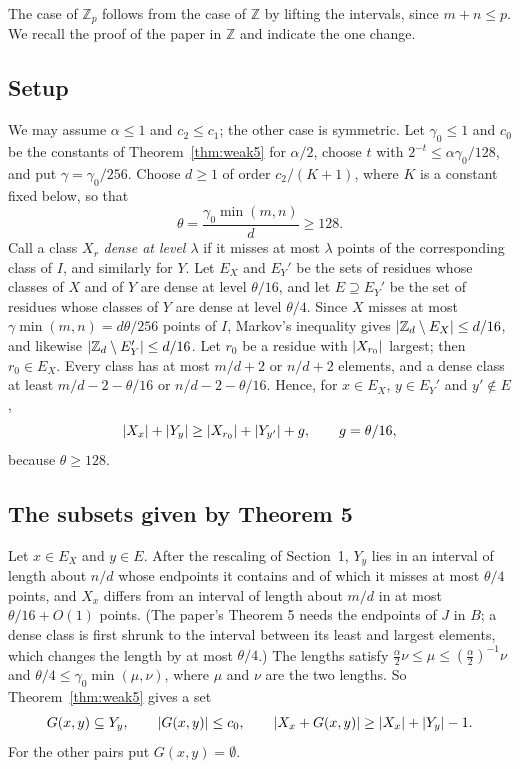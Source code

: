 \documentclass[11pt]{amsart}
\theoremstyle{remark}
\newcommand{\Z}{\mathbb{Z}}
\DeclarePairedDelimiter{\abs}{\lvert}{\rvert}
\begin{document}
The case of $\Z_p$ follows from the case of $\Z$ by lifting the intervals, since $m + n \le p$. We
recall the proof of the paper in $\Z$ and indicate the one change.

\subsection*{Setup}
We may assume $\alpha \le 1$ and $c_2 \le c_1$; the other case is symmetric. Let $\gamma_0 \le 1$
and $c_0$ be the constants of Theorem~\ref{thm:weak5} for $\alpha/2$, choose $t$ with
$2^{-t} \le \alpha\gamma_0/128$, and put $\gamma = \gamma_0/256$. Choose $d \ge 1$ of order
$c_2/(K + 1)$, where $K$ is a constant fixed below, so that
\[
  \theta = \frac{\gamma_0 \min(m, n)}{d} \ge 128 .
\]
Call a class $X_r$ \emph{dense at level $\lambda$} if it misses at most $\lambda$ points of the
corresponding class of $I$, and similarly for $Y$. Let $E_X$ and $E_Y'$ be the sets of residues
whose classes of $X$ and of $Y$ are dense at level $\theta/16$, and let $E \supseteq E_Y'$ be the
set of residues whose classes of $Y$ are dense at level $\theta/4$. Since $X$ misses at most
$\gamma \min(m, n) = d\theta/256$ points of $I$, Markov's inequality gives
$\abs{\Z_d \setminus E_X} \le d/16$, and likewise $\abs{\Z_d \setminus E_Y'} \le d/16$. Let
$r_0$ be a residue with $\abs{X_{r_0}}$ largest; then $r_0 \in E_X$. Every class has at most
$m/d + 2$ or $n/d + 2$ elements, and a dense class at least $m/d - 2 - \theta/16$ or
$n/d - 2 - \theta/16$. Hence, for $x \in E_X$, $y \in E_Y'$ and $y' \notin E$,
\begin{equation}\label{eq:gain}
  \abs{X_x} + \abs{Y_y} \ge \abs{X_{r_0}} + \abs{Y_{y'}} + g,
  \qquad g = \theta/16 ,
\end{equation}
because $\theta \ge 128$.

\subsection*{The subsets given by Theorem 5}
Let $x \in E_X$ and $y \in E$. After the rescaling of Section~1, $Y_y$ lies in an interval of
length about $n/d$ whose endpoints it contains and of which it misses at most $\theta/4$ points,
and $X_x$ differs from an interval of length about $m/d$ in at most $\theta/16 + O(1)$ points.
(The paper's Theorem 5 needs the endpoints of $J$ in $B$; a dense class is first shrunk to the
interval between its least and largest elements, which changes the length by at most $\theta/4$.)
The lengths satisfy $\tfrac{\alpha}{2}\nu \le \mu \le (\tfrac{\alpha}{2})^{-1}\nu$ and
$\theta/4 \le \gamma_0 \min(\mu, \nu)$, where $\mu$ and $\nu$ are the two lengths. So
Theorem~\ref{thm:weak5} gives a set
\[
  G(x, y) \subseteq Y_y, \qquad \abs{G(x, y)} \le c_0, \qquad
  \abs{X_x + G(x, y)} \ge \abs{X_x} + \abs{Y_y} - 1 .
\]
For the other pairs put $G(x, y) = \emptyset$.
\end{document}
